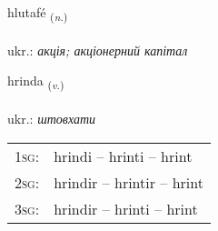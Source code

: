 \documentclass[frontgrid, backgrid]{flacards}\usepackage[]{graphicx}\usepackage[]{xcolor}
\begin{document}
\renewcommand{\flhead}{\vskip5pt \fboxsep=0pt {\small\bfseries\footnotesize Nafnorð | іменник}}
\renewcommand{\fcfoot}{\vskip5pt \fboxsep=0pt \hspace{2pt}{\small\bfseries\footnotesize 3K}}

\renewcommand{\blhead}{\vskip5pt {\small\bfseries\footnotesize Nafnorð | іменник }}
\renewcommand{\bcfoot}{\vskip5pt \hspace{2pt}{\small\bfseries\footnotesize 3K}}


{hlutafé \small{\textsubscript{(\textit{n.})}} \\[1ex] %
\textphonetic{[l̥ʏːtafjɛ]} \\
ukr.: \emph{акція; акціонерний капітал} \\  [2ex]
\renewcommand*{\arraystretch}{0.8}
}

\renewcommand{\flhead}{\vskip5pt \fboxsep=0pt {\small\bfseries\footnotesize Sagnorð | дієслово}}
\renewcommand{\fcfoot}{\vskip5pt \fboxsep=0pt \hspace{2pt}{\small\bfseries\footnotesize 3K}}

\renewcommand{\blhead}{\vskip5pt {\small\bfseries\footnotesize Sagnorð | дієслово }}
\renewcommand{\bcfoot}{\vskip5pt \hspace{2pt}{\small\bfseries\footnotesize 3K}}


{hrinda \small{\textsubscript{(\textit{v.})}} \\[1ex] %
\textphonetic{[r̥ɪnta]} \\
ukr.: \emph{штовхати} \\  [2ex]
\renewcommand*{\arraystretch}{0.8}
\begin{tabular}{p{1cm}l}
\textsc{1sg}: & hrindi -- hrinti -- hrint \\ 
\textsc{2sg}: & hrindir -- hrintir -- hrint \\ 
\textsc{3sg}: & hrindir -- hrinti -- hrint \\ 
\end{tabular}
}
\end{document}
